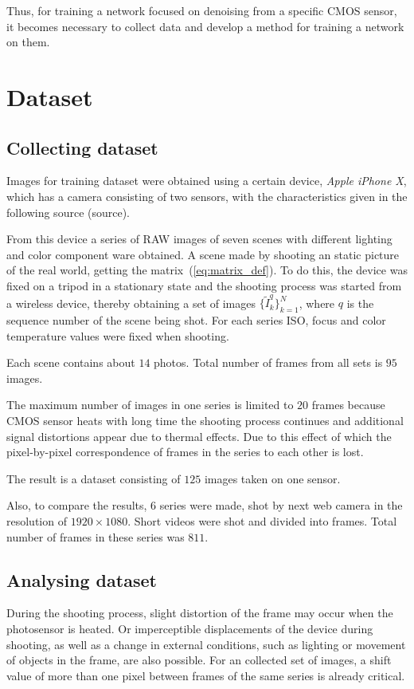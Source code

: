 \documentclass[runningheads]{llncs}
\begin{document}
Thus, for training a network focused on denoising from a specific CMOS sensor, it becomes necessary to collect data and develop a method for training a network on them.

\section{Dataset}

\subsection{Collecting dataset}

Images for training dataset were obtained using a certain device, \textit{Apple iPhone X}, which has a camera consisting of two sensors, with the characteristics given in the following source (source).

From this device a series of RAW images of seven scenes with different lighting and color component ware obtained. A scene made by shooting an static picture of the real world, getting the matrix~(\ref{eq:matrix_def}). To do this, the device was fixed on a tripod in a stationary state and the shooting process was started from a wireless device, thereby obtaining a set of images $\{\tilde{I}^q_k\}_{k=1}^{N}$, where $q$ is the sequence number of the scene being shot. For each series ISO, focus and color temperature values were fixed when shooting.

Each scene contains about $14$ photos. Total number of frames from all sets is $ 95 $ images.

The maximum number of images in one series is limited to $20$ frames because CMOS sensor heats with long time the shooting process continues and additional signal distortions appear due to thermal effects. Due to this effect of which the pixel-by-pixel correspondence of frames in the series to each other is lost.

The result is a dataset consisting of $125$ images taken on one sensor.

Also, to compare the results, 6 series were made, shot by next web camera in the resolution of $1920\times1080$. Short videos were shot and divided into frames. Total number of frames in these series was $811$.

\subsection{Analysing dataset}
During the shooting process, slight distortion of the frame may occur when the photosensor is heated. Or imperceptible displacements of the device during shooting, as well as a change in external conditions, such as lighting or movement of objects in the frame, are also possible. For an collected set of images, a shift value of more than one pixel between frames of the same series is already critical.
\end{document}

